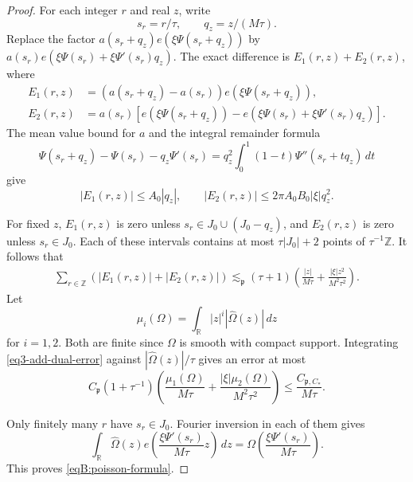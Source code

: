 \documentclass[reqno,12pt]{amsart}
\def \Z {\mathbb Z}
\def \R {\mathbb R}
\numberwithin{equation}{section}
\begin{document}
\begin{proof}
For each integer
$r$ and real $z$, write
\[
 s_r=r/\tau,\qquad q_z=z/(M\tau).
\]
Replace the factor
$a(s_r+q_z)e(\xi\Psi(s_r+q_z))$ by
$a(s_r)e(\xi\Psi(s_r)+\xi\Psi'(s_r)q_z)$.
The exact difference is $E_1(r,z)+E_2(r,z)$, where
\begin{align*}
 E_1(r,z)&=(a(s_r+q_z)-a(s_r))e(\xi\Psi(s_r+q_z)),\\
 E_2(r,z)&=a(s_r)\left[e(\xi\Psi(s_r+q_z))
             -e(\xi\Psi(s_r)+\xi\Psi'(s_r)q_z)\right].
\end{align*}
The mean value bound for $a$ and the integral remainder formula
\[
 \Psi(s_r+q_z)-\Psi(s_r)-q_z\Psi'(s_r)
 =q_z^2\int_0^1(1-t)\Psi''(s_r+tq_z)\,dt
\]
give
\[
 |E_1(r,z)|\le A_0|q_z|,\qquad
 |E_2(r,z)|\le 2\pi A_0B_0|\xi|q_z^2.
\]

For fixed $z$, $E_1(r,z)$ is zero unless
$s_r\in J_0\cup(J_0-q_z)$, and $E_2(r,z)$ is zero unless
$s_r\in J_0$. Each of these intervals contains at most
$\tau|J_0|+2$ points of $\tau^{-1}\Z$.
It follows that
\begin{equation}
 \begin{split}
 \sum_{r\in\Z}(|E_1(r,z)|+|E_2(r,z)|)
 \lesssim_{\mathfrak p}(\tau+1)
       \left(\frac{|z|}{M\tau}+\frac{|\xi|z^2}{M^2\tau^2}\right).
 \end{split}
 \label{eq3-add-dual-error}
\end{equation}
Let $$\mu_i(\Omega)=\int_\R|z|^i|\widehat\Omega(z)|\,dz$$ for
$i=1,2$. Both are finite since $\Omega$ is smooth with compact
support. Integrating \eqref{eq3-add-dual-error} against
$|\widehat\Omega(z)|/\tau$ gives an error at most
\[
 C_{\mathfrak p}(1+\tau^{-1})
 \left(\frac{\mu_1(\Omega)}{M\tau}
       +\frac{|\xi|\mu_2(\Omega)}{M^2\tau^2}\right)
 \le\frac{C_{\mathfrak p,C_*}}{M\tau}.
\]

Only finitely many $r$ have $s_r\in J_0$.
Fourier inversion in each of them gives
\[
 \int_\R\widehat\Omega(z)
       e\left(\frac{\xi\Psi'(s_r)}{M\tau}z\right)\,dz
 =\Omega\left(\frac{\xi\Psi'(s_r)}{M\tau}\right).
\]
This proves \eqref{eqB:poisson-formula}.


\end{proof}
\end{document}

